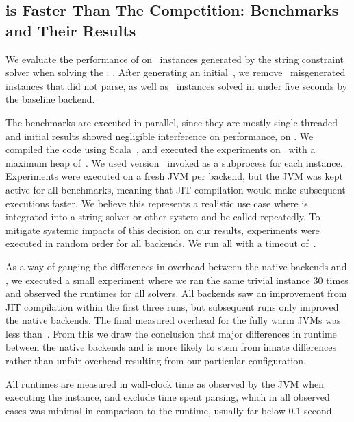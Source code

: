 \documentclass[acmsmall,review,anonymous]{acmart}\settopmatter{printfolios=true,printccs=false,printacmref=true}
\theoremstyle{definition}
\begin{document}
\subsection{\Catra{} is Faster Than The Competition: Benchmarks and Their Results}\label{sec:experiments}

We evaluate the performance of \Catra{} on~\NrBenchmarks{} instances generated by the \Ostrich{} string constraint solver when solving the . . After generating an initial~\InitialNrBenchmarks{}, we remove~\NrBroken{} misgenerated instances that did not parse, as well as~\NrTrivial{} instances solved in under five seconds by the baseline backend.

The benchmarks are executed in parallel, since they are mostly single-threaded and initial results showed negligible interference on performance, on \BenchmarkRig{}. We compiled the code using Scala~\ScalaVersion{}, and executed the experiments on~\JvmVersion{} with a maximum heap of~\MaxHeapSize{}. We used \Nuxmv{} version~\NuxmvVersion{} invoked as a subprocess for each instance. Experiments were executed on a fresh JVM per backend, but the JVM was kept active for all benchmarks, meaning that JIT compilation would make subsequent executions faster. We believe this represents a realistic use case where \Calculus{} is integrated into a string solver or other system and be called repeatedly. To mitigate systemic impacts of this decision on our results, experiments were executed in random order for all backends. We run all  with a timeout of~\RuntimeTimeout{}.

As a way of gauging the differences in overhead between the native backends and \Nuxmv, we executed a small experiment where we ran the same trivial instance 30 times and observed the runtimes for all solvers. All backends saw an improvement from JIT compilation within the first three runs, but subsequent runs only improved the native backends. The final measured overhead for the fully warm JVMs was less than~\OverheadSeconds. From this we draw the conclusion that major differences in runtime between the native backends and \Nuxmv{} is more likely to stem from innate differences rather than unfair overhead resulting from our particular configuration.

All runtimes are measured in wall-clock time as observed by the JVM when executing the instance, and exclude time spent parsing, which in all observed cases was minimal in comparison to the runtime, usually far below 0.1 second.
\end{document}

